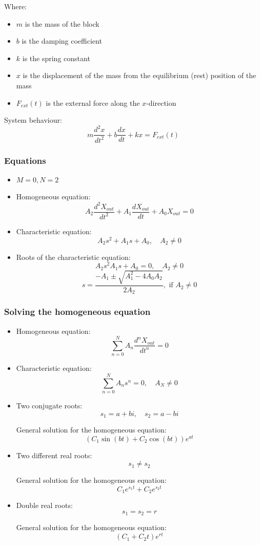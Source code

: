 \documentclass[11pt]{article}
\begin{document}
Where:
\begin{itemize}
\item \(m\) is the mass of the block
\item \(b\) is the damping coefficient
\item \(k\) is the spring constant
\item \(x\) is the displacement of the mass from the equilibrium (rest) position of the mass
\item \(F_{ext} (t)\) is the external force along the \(x\)-direction
\end{itemize}

System behaviour:
\[m \frac{d^2 x}{dt^2} + b \frac{dx}{dt} + kx = F_{ext} (t)\]

 \newpage
\subsubsection{Equations}
\label{sec:orgaea66e6}
\begin{itemize}
\item \(M = 0, N = 2\)
\item Homogeneous equation:
\[A_2 \frac{d^2 X_{out}}{dt^2} + A_1 \frac{dX_{out}}{dt} + A_0 X_{out} = 0\]
\item Characteristic equation:
\[A_2 s^2 + A_1 s + A_0, \quad A_2 \ne 0\]
\item Roots of the characteristic equation:
\[A_2 s^2 A_1 s + A_0 = 0, \quad A_2 \ne 0\]
\[s = \frac{- A_1 \pm \sqrt{A_1^2 - 4 A_0 A_2}}{2 A_2}, \text{ if } A_2 \ne 0\]
\end{itemize}

 \newpage
\subsubsection{Solving the homogeneous equation}
\label{sec:org4bbc914}
\begin{itemize}
\item Homogeneous equation:
\[\sum_{n = 0}^N A_n \frac{d^n X_{out}}{dt^n} = 0\]
\item Characteristic equation:
\[\sum_{n = 0}^N A_n s^n = 0, \quad A_N \ne 0\]
\item Two conjugate roots:
\[s_1 = a + bi, \quad s_2 = a - bi\]

General solution for the homogeneous equation:
\[(C_1 \sin (bt) + C_2 \cos (bt)) e^{at}\]

\item Two different real roots:
\[s_1 \ne s_2\]

General solution for the homogeneous equation:
\[C_1 e^{s_1 t} + C_2 e^{s_2 t}\]

\item Double real roots:
\[s_1 = s_2 = r\]

General solution for the homogeneous equation:
\[(C_1 + C_2 t) e^{rt}\]
\end{itemize}
\end{document}
